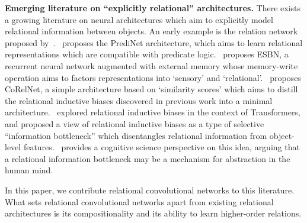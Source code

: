 \textbf{Emerging literature on ``explicitly relational'' architectures.} There exists a growing literature on neural architectures which aim to explicitly model relational information between objects. An early example is the relation network proposed by~\citet{santoroSimpleNeural2017}.~\citet{shanahanExplicitlyRelationalNeural} proposes the PrediNet architecture, which aims to learn relational representations which are compatible with predicate logic.~\citet{webbEmergentSymbols2021} proposes ESBN, a recurrent neural network augmented with external memory whose memory-write operation aims to factors representations into `sensory' and `relational'.~\citet{kergNeuralArchitecture2022} proposes CoRelNet, a simple architecture based on `similarity scores' which aims to distill the relational inductive biases discovered in previous work into a minimal architecture.~\citet{altabaaAbstractorsTransformer2023} explored relational inductive biases in the context of Transformers, and proposed a view of relational inductive biases as a type of selective ``information bottleneck'' which disentangles relational information from object-level features.~\citet{webbRelationalBottleneckInductive2023} provides a cognitive science perspective on this idea, arguing that a relational information bottleneck may be a mechanism for abstraction in the human mind.%

In this paper, we contribute relational convolutional networks to this literature. What sets relational convolutional networks apart from existing relational architectures is its  compositionality and its ability to learn higher-order relations.